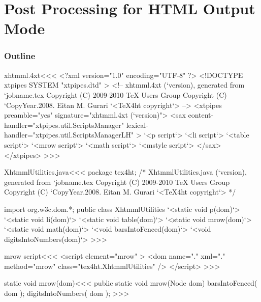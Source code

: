 \documentclass{article}
\begin{document}





\part{Post Processing for HTML Output Mode}


\section{Outline}



\<xhtmml.4xt\><<<
<?xml version="1.0" encoding="UTF-8" ?>
<!DOCTYPE xtpipes SYSTEM "xtpipes.dtd" >
<!-- xhtmml.4xt (`version), generated from `jobname.tex
     Copyright (C) 2009-2010 TeX Users Group
     Copyright (C) `CopyYear.2008. Eitan M. Gurari
`<TeX4ht copyright`> -->
<xtpipes preamble="yes" signature="xhtmml.4xt (`version)">
   <sax content-handler="xtpipes.util.ScriptsManager" 
        lexical-handler="xtpipes.util.ScriptsManagerLH" >
     `<p script`>
     `<li script`>
     `<table script`>
     `<mrow script`>
     `<math script`>
     `<mstyle script`>
   </sax>
</xtpipes>
>>>


% 


\<XhtmmlUtilities.java\><<<
package tex4ht;
/* XhtmmlUtilities.java (`version), generated from `jobname.tex
   Copyright (C) 2009-2010 TeX Users Group
   Copyright (C) `CopyYear.2008. Eitan M. Gurari
`<TeX4ht copyright`> */

import org.w3c.dom.*;
public class XhtmmlUtilities {
  `<static void p(dom)`>
  `<static void li(dom)`>
  `<static void table(dom)`>
  `<static void mrow(dom)`>
  `<static void math(dom)`>
  `<void barsIntoFenced(dom)`>
  `<void digitsIntoNumbers(dom)`>
}
>>>





\<mrow script\><<<
<script element="mrow" >
   <dom name="." xml="." method="mrow" class="tex4ht.XhtmmlUtilities" />
</script> 
>>>




\<static void mrow(dom)\><<<
public static void mrow(Node dom) {
   barsIntoFenced( dom );
   digitsIntoNumbers( dom );
}
>>>
\end{document}
